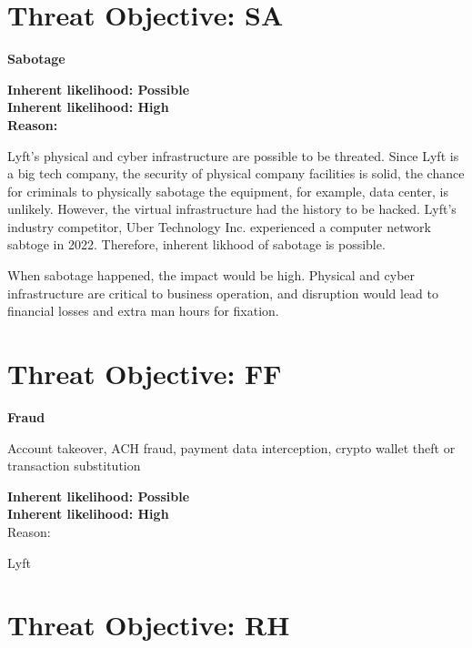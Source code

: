 \documentclass[11pt]{article}
\begin{document}
\section{Threat Objective: SA}
\textbf{Sabotage}



\begin{boxB}
    \textbf{Inherent likelihood: Possible}\\
    \textbf{Inherent likelihood: High}\\
    \textbf{Reason: }

Lyft's physical and cyber infrastructure are possible to be threated. Since Lyft is a big tech company, the security of physical company facilities is solid, the chance for criminals to physically sabotage the equipment, for example, data center, is unlikely. However, the virtual infrastructure had the history to be hacked. Lyft's industry competitor, Uber Technology Inc. experienced a computer network sabtoge in 2022\cite{Conger_Roose_2022}. Therefore, inherent likhood of sabotage is possible.

When sabotage happened, the impact would be high. Physical and cyber infrastructure are critical to business operation, and disruption would lead to financial losses and extra man hours for fixation.

\end{boxB}




\section{Threat Objective: FF}
\textbf{Fraud}


Account takeover, ACH fraud, payment data interception, 
crypto wallet theft or transaction substitution


\begin{boxB}


    \textbf{Inherent likelihood: Possible}\\
    \textbf{Inherent likelihood: High}\\

    Reason:

    Lyft 

\end{boxB}

\section{Threat Objective: RH}
\end{document}
